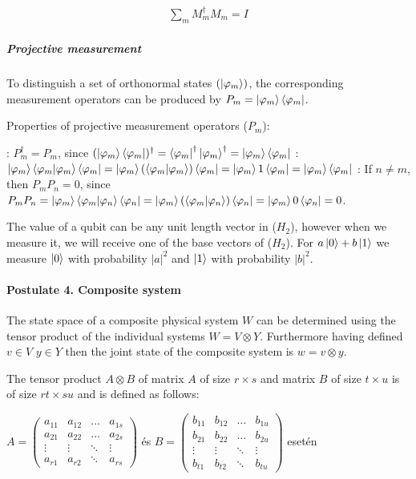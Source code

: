 \begin{align}
    \sum\limits_{m}  M_m^{\dagger} M_m = I
\end{align}

\subparagraph{Projective measurement}

To distinguish a set of orthonormal states $(\ket{\varphi_m})$, the corresponding measurement operators can be produced by $P_m = \ket{\varphi_m}\bra{\varphi_m}$.

Properties of projective measurement operators ($P_m$):

: $P_m^{\dagger} = P_m$, since $(\ket{\varphi_m}\bra{\varphi_m})^{\dagger} = 
\bra{\varphi_m}^{\dagger}\ket{\varphi_m}^{\dagger} = \ket{\varphi_m}\bra{\varphi_m} $
: $\ket{\varphi_m}\bra{\varphi_m}\ket{\varphi_m}\bra{\varphi_m} = 
\ket{\varphi_m}(\bra{\varphi_m}\ket{\varphi_m})\bra{\varphi_m} = \ket{\varphi_m}1\bra{\varphi_m} = \ket{\varphi_m}\bra{\varphi_m}$
: If $n\neq{}m$, then $P_mP_n = 0$, since $P_mP_n =\ket{\varphi_m}\bra{\varphi_m}\ket{\varphi_n}\bra{\varphi_n} =\ket{\varphi_m}(\bra{\varphi_m}\ket{\varphi_n})\bra{\varphi_n} =\ket{\varphi_m}0\bra{\varphi_n} = 0$.

The value of a qubit can be any unit length vector in ($H_2$), however when we measure it, we will receive one
of the base vectors of ($H_2$). For $a\ket{0} + b\ket{1}$ we measure $\ket{0}$ with probability $|a|^2$ and $\ket{1}$ with probability $|b|^2$.

\paragraph{Postulate 4. Composite system}
The state space of a composite physical system $W$ can be determined using the tensor product of the individual systems $W = V \otimes Y$. Furthermore having defined $v \in V$ $y \in Y$ then the joint state of the composite system is $w = v \otimes y$.

 The tensor product $A \otimes B$ of matrix $A$ of size $r \times s$ and matrix $B$ of size $t \times u$ is of size $rt \times su$ and is defined as follows:

\begin{center}
  $A = \begin{pmatrix}
      a_{11} & a_{12} & \dots  & a_{1s} \\
      a_{21} & a_{22} & \dots  & a_{2s} \\
      \vdots & \vdots & \ddots & \vdots \\
      a_{r1} & a_{r2} & \ddots & a_{rs}
    \end{pmatrix}
  $
  és
  $B = \begin{pmatrix}
      b_{11} & b_{12} & \dots  & b_{1u} \\
      b_{21} & b_{22} & \dots  & b_{2u} \\
      \vdots & \vdots & \ddots & \vdots \\
      b_{t1} & b_{t2} & \ddots & b_{tu}
    \end{pmatrix}
  $ esetén
\end{center}


